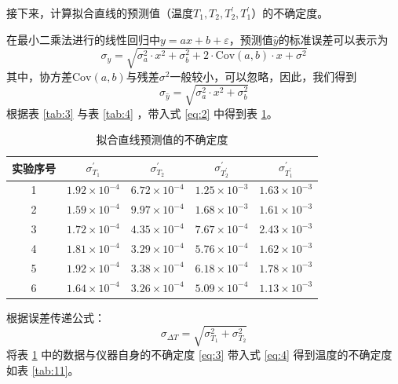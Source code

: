 \documentclass[cn,hazy,pku,12pt,normal,math=newtx,cite=super]{elegantnote}
\begin{document}
接下来，计算拟合直线的预测值（温度$T_1,T_2,T_2^\prime,T_1^\prime$）的不确定度。

在最小二乘法进行的线性回归中$y = ax + b + \varepsilon$，预测值$\hat y$的标准误差可以表示为
\begin{equation*}
    \sigma_{\hat{y}} = \sqrt{ \sigma_{a}^2 \cdot x^2 + \sigma_{b}^2 + 2 \cdot \mathrm{Cov}(a, b) \cdot x + \sigma^2 } 
\end{equation*}
其中，协方差$\mathrm{Cov}(a,b)$与残差$\sigma^2$一般较小，可以忽略，因此，我们得到
\begin{equation}\label{eq:2}
    \sigma_{\hat{y}} = \sqrt{ \sigma_{a}^2 \cdot x^2 + \sigma_{b}^2}
\end{equation}
根据表 \ref{tab:3} 与表 \ref{tab:4} ，带入式 \eqref{eq:2} 中得到表 \ref{tab:10}。

\begin{table}[htbp]
    \centering
    \caption{拟合直线预测值的不确定度}
    \begin{tabular}{ccccc}
        \toprule
        实验序号 & $\sigma_{T_1}^\prime$ & $\sigma_{T_2}^\prime$ & $\sigma_{T_2^\prime}^\prime$ & $\sigma_{T_1^\prime}^\prime$ \\
        \midrule
        1 & $1.92 \times 10^{-4}$ & $6.72 \times 10^{-4}$ & $1.25 \times 10^{-3}$ & $1.63 \times 10^{-3}$ \\
        2 & $1.59 \times 10^{-4}$ & $9.97 \times 10^{-4}$ & $1.68 \times 10^{-3}$ & $1.61 \times 10^{-3}$ \\
        3 & $1.72 \times 10^{-4}$ & $4.35 \times 10^{-4}$ & $7.67 \times 10^{-4}$ & $2.43 \times 10^{-3}$ \\
        4 & $1.81 \times 10^{-4}$ & $3.29 \times 10^{-4}$ & $5.76 \times 10^{-4}$ & $1.62 \times 10^{-3}$ \\
        5 & $1.92 \times 10^{-4}$ & $3.38 \times 10^{-4}$ & $6.18 \times 10^{-4}$ & $1.78 \times 10^{-3}$ \\
        6 & $1.64 \times 10^{-4}$ & $3.26 \times 10^{-4}$ & $5.09 \times 10^{-4}$ & $1.13 \times 10^{-3}$ \\
        \bottomrule
    \end{tabular}
    \label{tab:10}
\end{table}

根据误差传递公式：
\begin{equation}\label{eq:4}
    \sigma_{\Delta T}= \sqrt{\sigma_{T_1}^2+\sigma_{T_2}^2}
\end{equation}
将表 \ref{tab:10} 中的数据与仪器自身的不确定度 \eqref{eq:3} 带入式 \eqref{eq:4} 得到温度的不确定度如表 \ref{tab:11}。
\end{document}
